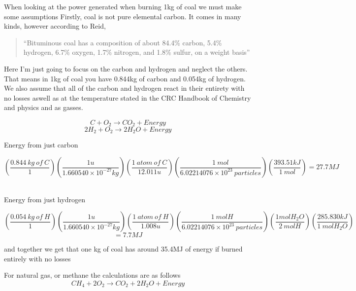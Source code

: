 \documentclass{article}
\begin{document}
\vspace{10pt}When looking at the power generated when burning 1kg of coal we must make some assumptions
Firstly, coal is not pure elemental carbon. It comes in many kinds, however according to Reid,

\begin{quote}
    ``Bituminous coal has a composition of about 84.4\% carbon, 5.4\% hydrogen, 6.7\% oxygen, 1.7\% nitrogen, and 1.8\% sulfur, on a weight basis''
\end{quote}


Here I'm just going to focus on the carbon and hydrogen and neglect the others. That means in 1kg of coal you have 0.844kg of carbon and 0.054kg of hydrogen. We also assume that all of the carbon and hydrogen react in their entirety with no losses aswell as at the temperature stated in the CRC Handbook of Chemistry and physics and as gasses.\vspace{10pt}

$$C+O_2\xrightarrow{}CO_2+Energy$$
$$2H_2+O_2\xrightarrow{}2H_2O+Energy$$


\begin{center}
    Energy from just carbon
\end{center}
$$\left(\frac{0.844 \ kg \ of \ C}{1}\right)\left(\frac{1u}{1.660540\times10^{-27}kg}\right)\left(\frac{1 \ atom \ of \ C}{12.011u}\right)\left(\frac{1 \ mol}{6.02214076\times10^{23}\ particles}\right)\left(\frac{393.51kJ}{1 \ mol}\right)= 27.7MJ$$\vspace{10pt}
\
\begin{center}
    Energy from just hydrogen
\end{center}

$$\left(\frac{0.054 \ kg \ of \ H}{1}\right)\left(\frac{1u}{1.660540\times10^{-27}kg}\right)\left(\frac{1 \ atom \ of \ H}{1.008u}\right)\left(\frac{1 \ mol H}{6.02214076\times10^{23}\ particles}\right)\left(\frac{1mol
H_2O}{2 \ mol H}\right)\left(\frac{285.830kJ}{1 \ mol H_2O}\right)$$\vspace{10pt}
$$=7.7MJ$$

\begin{center}
    and together we get that one kg of coal has around 35.4MJ of energy if burned entirely with no losses
\end{center}\vspace{10pt}

For natural gas, or methane the calculations are as follows \vspace{10pt}
$$CH_4+2O_2\xrightarrow{}CO_2+2H_2O+Energy$$
\end{document}
